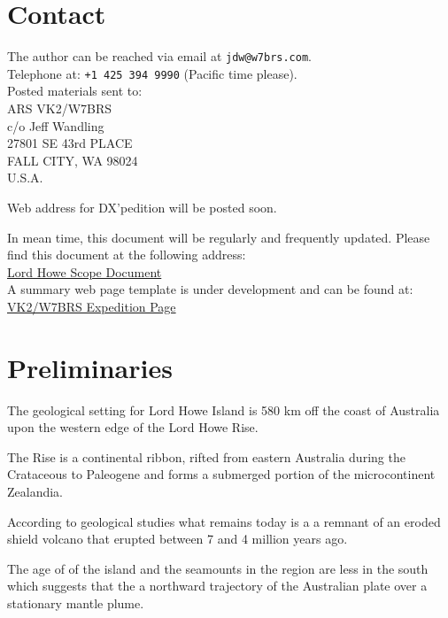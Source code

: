 \documentclass[11pt]{article}
\begin{document}
\section*{Contact}
The author can be reached via email at {\texttt{jdw@w7brs.com}}.\\[1cm]
Telephone at: {\texttt{+1 425 394 9990}} (Pacific time please).\\[5mm]
Posted materials sent to:\\[4mm]
ARS VK2/W7BRS\\
c/o Jeff Wandling\\
27801 SE 43rd PLACE\\
FALL CITY, WA 98024\\
U.S.A.\\
\par
\noindent
Web address for DX'pedition will be posted soon.
\par
\noindent
In mean time, this document will be regularly and frequently updated.
Please find this document at the following address:\\[3mm]
\noindent
\href{http://w7brs.com/vk9l/scope.pdf}{Lord Howe Scope Document}\\[3mm]
\noindent
A summary web page template is under development and can be found at:\\[3mm]
\noindent
\href{http://w7brs.com/vk9l}{VK2/W7BRS Expedition Page}\\[3mm]
\par
\newpage

\tableofcontents
\listoffigures
\listoftables

\newpage
\section{Preliminaries}

The geological setting for Lord Howe Island is 580 km off the coast
of Australia upon the western edge of the Lord Howe Rise.

\par
The Rise is a continental ribbon, rifted from eastern 
Australia during the Crataceous to Paleogene and
forms a submerged portion of the microcontinent
Zealandia.\cite{reflhi}
\par
According to geological studies what remains today is a 
a remnant of an eroded shield volcano that 
erupted between 7 and 4 million years ago. 
\par
The age of of the island and the seamounts in the region are less in the
south which suggests that the a northward trajectory of the Australian plate
over a stationary mantle plume.
\par
\end{document}

